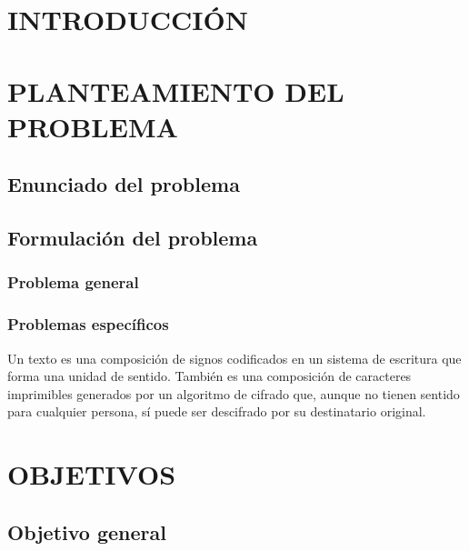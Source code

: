 \documentclass[12pt,a4paper]{article} %
\begin{document}
\newpage %
\setcounter{page}{1}
\pagestyle{fancy} %

\tableofcontents %
\listoffigures  %
\listoftables %


\newpage

\section*{INTRODUCCIÓN}
    \lipsum[1-3]


\newpage
\section{PLANTEAMIENTO DEL PROBLEMA}
    \subsection{Enunciado del problema}
    	\lipsum[4]

    \subsection{Formulación del problema}
    	\lipsum[5]
        \subsubsection{Problema general}
        	\lipsum[6]
        \subsubsection{Problemas específicos}
        	Un texto es una composición de signos codificados en un sistema
					de escritura que forma una unidad de sentido. También es una composición de caracteres imprimibles generados por un algoritmo de cifrado que, aunque no tienen sentido para cualquier persona, sí puede ser descifrado por su destinatario original.


\newpage
\section{OBJETIVOS}
    \subsection{Objetivo general}
    	\lipsum[8]
\end{document}
